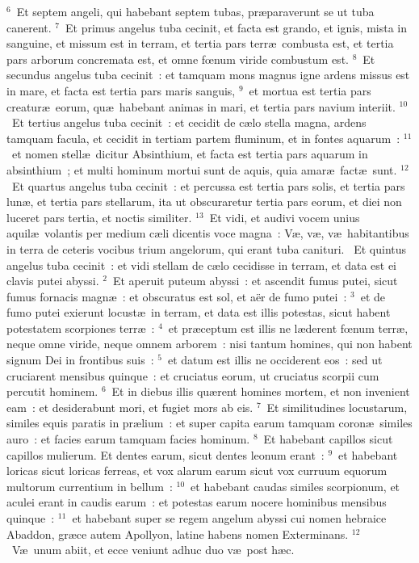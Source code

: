 ${}^{6}$~Et septem angeli, qui habebant septem tubas, pr\ae paraverunt se ut tuba canerent.
${}^{7}$~Et primus angelus tuba cecinit, et facta est grando, et ignis, mista in sanguine, et missum est in terram, et tertia pars terr\ae\ combusta est, et tertia pars arborum concremata est, et omne fœnum viride combustum est.
${}^{8}$~Et secundus angelus tuba cecinit~: et tamquam mons magnus igne ardens missus est in mare, et facta est tertia pars maris sanguis,
${}^{9}$~et mortua est tertia pars creatur\ae\ eorum, qu\ae\ habebant animas in mari, et tertia pars navium interiit.
${}^{10}$~Et tertius angelus tuba cecinit~: et cecidit de c\ae lo stella magna, ardens tamquam facula, et cecidit in tertiam partem fluminum, et in fontes aquarum~:
${}^{11}$~et nomen stell\ae\ dicitur Absinthium, et facta est tertia pars aquarum in absinthium~; et multi hominum mortui sunt de aquis, quia amar\ae\ fact\ae\ sunt.
${}^{12}$~Et quartus angelus tuba cecinit~: et percussa est tertia pars solis, et tertia pars lun\ae , et tertia pars stellarum, ita ut obscuraretur tertia pars eorum, et diei non luceret pars tertia, et noctis similiter.
${}^{13}$~Et vidi, et audivi vocem unius aquil\ae\ volantis per medium c\ae li dicentis voce magna~: V\ae , v\ae , v\ae\ habitantibus in terra de ceteris vocibus trium angelorum, qui erant tuba canituri.
~Et quintus angelus tuba cecinit~: et vidi stellam de c\ae lo cecidisse in terram, et data est ei clavis putei abyssi.
${}^{2}$~Et aperuit puteum abyssi~: et ascendit fumus putei, sicut fumus fornacis magn\ae~: et obscuratus est sol, et a\"er de fumo putei~:
${}^{3}$~et de fumo putei exierunt locust\ae\ in terram, et data est illis potestas, sicut habent potestatem scorpiones terr\ae~:
${}^{4}$~et pr\ae ceptum est illis ne l\ae derent fœnum terr\ae , neque omne viride, neque omnem arborem~: nisi tantum homines, qui non habent signum Dei in frontibus suis~:
${}^{5}$~et datum est illis ne occiderent eos~: sed ut cruciarent mensibus quinque~: et cruciatus eorum, ut cruciatus scorpii cum percutit hominem.
${}^{6}$~Et in diebus illis qu\ae rent homines mortem, et non invenient eam~: et desiderabunt mori, et fugiet mors ab eis.
${}^{7}$~Et similitudines locustarum, similes equis paratis in pr\ae lium~: et super capita earum tamquam coron\ae\ similes auro~: et facies earum tamquam facies hominum.
${}^{8}$~Et habebant capillos sicut capillos mulierum. Et dentes earum, sicut dentes leonum erant~:
${}^{9}$~et habebant loricas sicut loricas ferreas, et vox alarum earum sicut vox curruum equorum multorum currentium in bellum~:
${}^{10}$~et habebant caudas similes scorpionum, et aculei erant in caudis earum~: et potestas earum nocere hominibus mensibus quinque~:
${}^{11}$~et habebant super se regem angelum abyssi cui nomen hebraice Abaddon, gr\ae ce autem Apollyon, latine habens nomen Exterminans.
${}^{12}$~V\ae\ unum abiit, et ecce veniunt adhuc duo v\ae\ post h\ae c.


